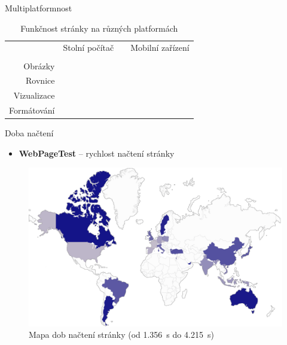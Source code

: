 \documentclass[14pt, hyperref={unicode}]{beamer}
\newcommand{\Firefox}{\faIcon{firefox}}
\newcommand{\Chrome}{\faIcon{chrome}}
\newcommand{\IE}{\faIcon{internet-explorer}}
\newcommand{\Edge}{\faIcon{edge}}
\newcommand{\Safari}{\faIcon{safari}}
\newcommand{\Opera}{\faIcon{opera}}
\newcommand{\Yes}{\faIcon{check}}
\newcommand{\No}{\faIcon{times}}
\newcommand{\NA}{\faIcon{minus}}
\begin{document}
  \begin{frame}{Multiplatformnost}
    \begin{minipage}[b]{\textwidth}
      \begin{table}[H]
        \caption{Funkčnost stránky na různých platformách}
        \scriptsize
        \centering
        \begin{tabular}{@{}rccccccccccccc@{}}
          \toprule
            & \multicolumn{6}{c}{Stolní počítač} & \phantom{abc} & \multicolumn{6}{c}{Mobilní zařízení} \\
          \cmidrule{2-7} \cmidrule{9-14}
            & \Firefox & \Chrome & \IE & \Edge & \Safari & \Opera && \Firefox & \Chrome & \IE & \Edge & \Safari & \Opera \\
          \midrule
            Obrázky     & \Yes & \Yes & \Yes & \Yes & \Yes & \Yes && \Yes & \Yes & \NA & \Yes & \Yes & \Yes \\
            Rovnice     & \Yes & \Yes & \Yes & \Yes & \Yes & \Yes && \Yes & \Yes & \NA & \Yes & \Yes & \Yes \\
            Vizualizace & \Yes & \Yes & \No  & \Yes & \Yes & \Yes && \Yes & \Yes & \NA & \Yes & \Yes & \Yes \\
            Formátování & \Yes & \Yes & \Yes & \Yes & \Yes & \Yes && \Yes & \Yes & \NA & \Yes & \Yes & \Yes \\
          \bottomrule
        \end{tabular}
      \end{table}
    \end{minipage}
  \end{frame}

  \begin{frame}{Doba načtení}
    \begin{itemize}
      \item \textbf{WebPageTest} -- rychlost načtení stránky
    \end{itemize}

    \pause

    \begin{figure}[H]
      \includegraphics[width=\textwidth,height=0.6\textheight,keepaspectratio]{map.png}
      \caption{Mapa dob načtení stránky (od \SI{1.356}{\second} do \SI{4.215}{\second})}
    \end{figure}
  \end{frame}
\end{document}
